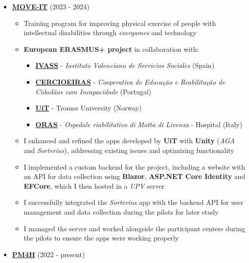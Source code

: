 \documentclass[letterpaper, 12pt, dvipsnames]{article}
\newcommand{\upv}{UPV}
\begin{document}
\begin{itemize}
    \item {\large\textbf{\href{https://moveit.webs.upv.es/}{MOVE-IT}}} (2023 - 2024)
          \begin{itemize}
              \item Training program for improving physical exercise of people with intellectual disabilities through \textit{exergames} and technology
              \item \textbf{European ERASMUS+ project} in collaboration with:
                    \begin{itemize}
                        \item \textbf{\href{https://www.ivass.gva.es/}{IVASS}} - \textit{Instituto Valenciano de Servicios Sociales} (Spain)
                        \item \textbf{\href{https://www.cercioeiras.pt/pt}{CERCIOEIRAS}} - \textit{Cooperativa de Educação e Reabilitação de Cidadãos com Incapacidade} (Portugal)
                        \item \textbf{\href{https://en.uit.no/}{UiT}} - Tromsø University (Norway)
                        \item \textbf{\href{https://www.ospedalemotta.it/it/}{ORAS}} - \textit{Ospedale riabilitativo di Motta di Livenza} - Hospital (Italy)
                    \end{itemize}
              \item I enhanced and refined the apps developed by \textbf{UiT} with \textbf{Unity} (\textit{AGA} and \textit{Sorterius}), addressing existing issues and optimizing functionality
              \item I implemented a custom backend for the project, including a website with an API for data collection using \textbf{Blazor}, \textbf{ASP.NET Core Identity} and \textbf{EFCore}, which I then hosted in a \textit{\upv} server
              \item I successfully integrated the \textit{Sorterius} app with the backend API for user management and data collection during the pilots for later study
              \item I managed the server and worked alongside the participant centers during the pilots to ensure the apps were working properly
          \end{itemize}
    \item {\large\textbf{\href{https://pm4health.com/}{PM4H}}} (2022 - present)
          \begin{itemize}

\end{itemize}
\end{itemize}
\end{document}
